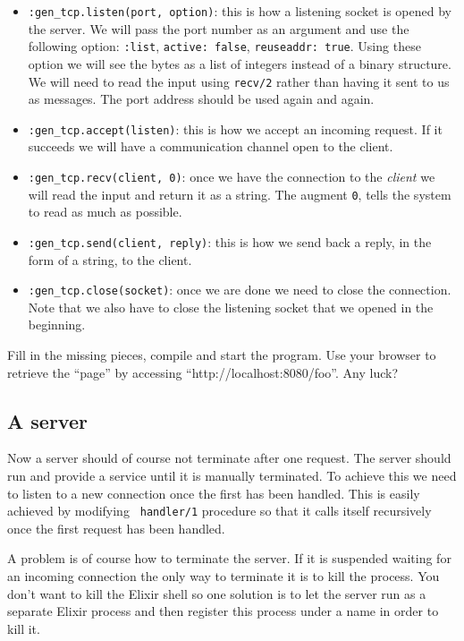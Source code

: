 \documentclass[a4paper,11pt]{article}
\begin{document}
\begin{itemize}
\item {\tt :gen\_tcp.listen(port, option)}: this is how a listening
socket is opened by the server. We will pass the port number as an
argument and use the following option: {\tt :list}, {\tt active: false}, 
{\tt reuseaddr: true}. Using these option we will see the
bytes as a list of integers instead of a binary structure. We will
need to read the input using {\tt recv/2} rather than having it sent
to us as messages. The port address should be used again and again. 

\item {\tt :gen\_tcp.accept(listen)}: this is how we accept an incoming
request. If it succeeds we will have a communication channel open to
the client.

\item {\tt :gen\_tcp.recv(client, 0)}: once we have the connection to the
{\em client} we will read the input and return it as a string. The
augment  {\tt 0}, tells the system to read as much as possible.

\item {\tt :gen\_tcp.send(client, reply)}: this is how we send back a reply,
in the form of a string, to the client.

\item {\tt :gen\_tcp.close(socket)}: once we are done we need to close the
connection. Note that we also have to close the listening socket that
we opened in the beginning.
\end{itemize}

Fill in the missing pieces, compile and start the program. Use your
browser to retrieve the ``page'' by accessing
``http://localhost:8080/foo''. Any luck?

\subsection{A server}
Now a server should of course not terminate after one request. The
server should run and provide a service until it is manually
terminated. To achieve this we need to listen to a new connection once
the first has been handled. This is easily achieved by modifying {\tt
  handler/1} procedure so that it calls itself recursively once the
first request has been handled.

A problem is of course how to terminate the server. If it is suspended
waiting for an incoming connection the only way to terminate it is to
kill the process. You don't want to kill the Elixir shell so one
solution is to let the server run as a separate Elixir process and then
register this process under a name in order to kill it.
\end{document}
